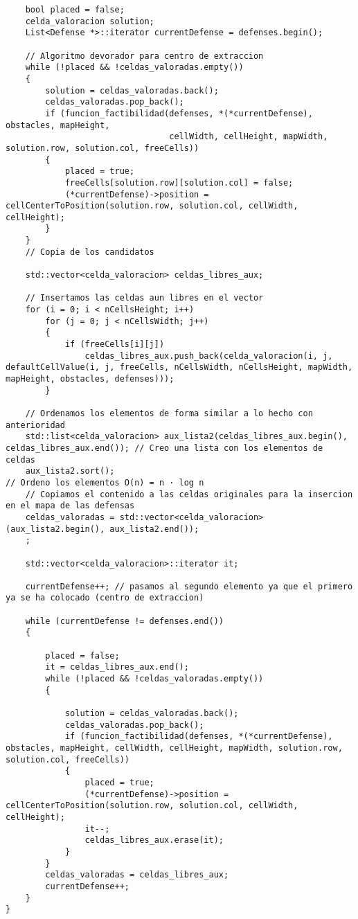 \begin{lstlisting}
    bool placed = false;
    celda_valoracion solution;
    List<Defense *>::iterator currentDefense = defenses.begin();

    // Algoritmo devorador para centro de extraccion
    while (!placed && !celdas_valoradas.empty())
    {
        solution = celdas_valoradas.back();
        celdas_valoradas.pop_back();
        if (funcion_factibilidad(defenses, *(*currentDefense), obstacles, mapHeight,
                                 cellWidth, cellHeight, mapWidth, solution.row, solution.col, freeCells))
        {
            placed = true;
            freeCells[solution.row][solution.col] = false;
            (*currentDefense)->position = cellCenterToPosition(solution.row, solution.col, cellWidth, cellHeight);
        }
    }
    // Copia de los candidatos

    std::vector<celda_valoracion> celdas_libres_aux;

    // Insertamos las celdas aun libres en el vector
    for (i = 0; i < nCellsHeight; i++)
        for (j = 0; j < nCellsWidth; j++)
        {
            if (freeCells[i][j])
                celdas_libres_aux.push_back(celda_valoracion(i, j, defaultCellValue(i, j, freeCells, nCellsWidth, nCellsHeight, mapWidth, mapHeight, obstacles, defenses)));
        }

    // Ordenamos los elementos de forma similar a lo hecho con anterioridad
    std::list<celda_valoracion> aux_lista2(celdas_libres_aux.begin(), celdas_libres_aux.end()); // Creo una lista con los elementos de celdas
    aux_lista2.sort();                                                                          // Ordeno los elementos O(n) = n · log n
    // Copiamos el contenido a las celdas originales para la insercion en el mapa de las defensas
    celdas_valoradas = std::vector<celda_valoracion>(aux_lista2.begin(), aux_lista2.end());
    ;

    std::vector<celda_valoracion>::iterator it;

    currentDefense++; // pasamos al segundo elemento ya que el primero ya se ha colocado (centro de extraccion)

    while (currentDefense != defenses.end())
    {

        placed = false;
        it = celdas_libres_aux.end();
        while (!placed && !celdas_valoradas.empty())
        {

            solution = celdas_valoradas.back();
            celdas_valoradas.pop_back();
            if (funcion_factibilidad(defenses, *(*currentDefense), obstacles, mapHeight, cellWidth, cellHeight, mapWidth, solution.row, solution.col, freeCells))
            {
                placed = true;
                (*currentDefense)->position = cellCenterToPosition(solution.row, solution.col, cellWidth, cellHeight);
                it--;
                celdas_libres_aux.erase(it);
            }
        }
        celdas_valoradas = celdas_libres_aux;
        currentDefense++;
    }
}
\end{lstlisting}